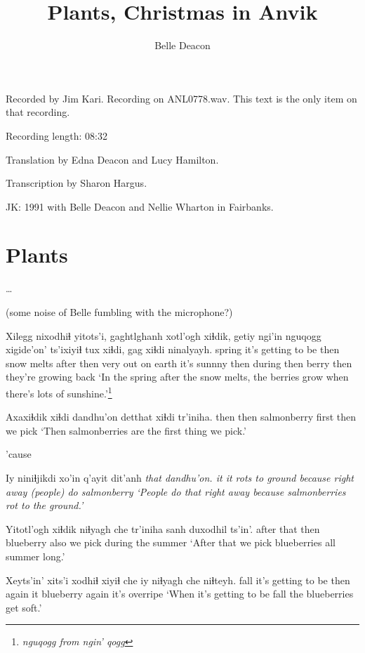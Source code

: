 \documentclass[12pt]{article}
\begin{document}
\title{Plants, Christmas in Anvik}
\author{Belle Deacon}
\date{}
\maketitle

Recorded by Jim Kari.  Recording on ANL0778.wav. This text
is the only item on that recording.

Recording length: 08:32

Translation by Edna Deacon and Lucy Hamilton.

Transcription by Sharon Hargus.

\bigskip 

JK:  1991 with Belle Deacon and Nellie Wharton in Fairbanks.

\section{Plants}

\ldots 

(some noise of Belle fumbling with the microphone?)

\gll Xilegg nixodhiɬ yitots'i, gaghtlghanh xotl'ogh xiɬdik, getiy ngi'in nguqogg    xigide'on'       ts'ixiyiɬ tux xiɬdi, gag xiɬdi ninalyayh.
spring {it's getting to be} then {snow melts} after then very   out {on earth}  {it's sunnny} then during then berry then {they're growing back}
\glt `In the spring after the snow melts, the berries grow when there's lots of sunshine.'\footnote{\em nguqogg \em from \em ngin' qogg}
\glend

\gll Axaxiɬdik xiɬdi dandhu'on detthat xiɬdi tr'iniha.
then  then  salmonberry first then {we pick}
\glt `Then salmonberries are the first thing we pick.'
\glend

'cause

\gll Iy niniɬjikdi xo'in q'ayit dit'anh \em that dandhu'on.
it {it rots to ground} because {right away} {(people) do} {} salmonberry
\glt `People do that right away because salmonberries rot to the ground.'
\glend

\gll Yitotl'ogh xiɬdik niɬyagh che tr'iniha {sanh duxodhil ts'in'}.
{after that} then blueberry also {we pick} {during the summer}
\glt `After that we pick blueberries all summer long.'
\glend

\gll Xeyts'in' {xits'i xodhiɬ} xiyiɬ che iy niɬyagh che niɬteyh.
fall     {it's getting to be} then again it blueberry again {it's overripe}
\glt `When it's getting to be fall the blueberries get soft.'
\glend
\end{document}
